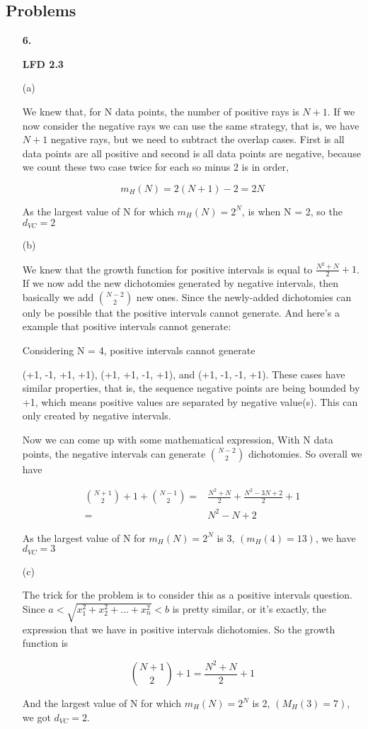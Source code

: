 \documentclass[11pt]{article}
\begin{document}
\subsection*{Problems}
\begin{enumerate}
\item[\textbf{6.}]

\textbf{LFD 2.3}

(a)

We knew that, for N data points, the number of positive rays is $N+1$. If we now consider the negative rays we can use the same strategy, that is, we have $N+1$ negative rays, but we need to subtract the overlap cases. First is all data points are all positive and second is all data points are negative, because we count these two case twice for each so minus 2 is in order, 

$$m_H(N) = 2(N+1) - 2 = 2N$$

As the largest value of N for which $m_H(N) = 2^N$, is when N = 2, so the $d_{VC} = 2$

(b)

We knew that the growth function for positive intervals is equal to 
$\frac{N^2 + N}{2} + 1$. If we now add the new dichotomies generated by negative intervals, then basically we add $\binom{N-2}{2}$ new ones. Since the newly-added dichotomies can only be possible that the positive intervals cannot generate. And here's a example that positive intervals cannot generate: 

Considering N = 4, positive intervals cannot generate 

(+1, -1, +1, +1), (+1, +1, -1, +1), and (+1, -1, -1, +1). These cases have similar properties, that is, the sequence negative points are being bounded by +1, which means positive values are separated by negative value(s). This can only created by negative intervals. 

Now we can come up with some mathematical expression, With N data points, the negative intervals can generate $\binom{N-2}{2}$ dichotomies. So overall we have

\begin{equation}
\begin{aligned}
\binom{N+1}{2} + 1 + \binom{N-1}{2} =& \frac{N^2+N}{2} + \frac{N^2-3N+2}{2} + 1\\
=& N^2 - N +2
\end{aligned}
\end{equation}

As the largest value of N for $m_H(N) = 2^N$ is 3, $(m_H(4) = 13)$, we have $d_{VC} = 3$

(c)

The trick for the problem is to consider this as a positive intervals question. Since $a< \sqrt{x_1^2 + x_2^2 + ... + x_n^2}<b$ is pretty similar, or it's exactly, the expression that we have in positive intervals dichotomies. So the growth function is

$$\binom{N+1}{2} +1 = \frac{N^2+N}{2}+1$$

And the largest value of N for which $m_H(N) = 2^N$ is 2, $(M_H(3) = 7)$, we got $d_{VC} = 2$.



\end{enumerate}
\pagebreak
\end{document}
